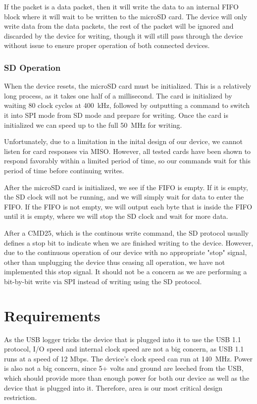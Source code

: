 \documentclass[12pt,letter,oneside]{report}
\begin{document}
If the packet is a data packet, then it will write the data to an internal FIFO block where it will wait to be written to the microSD card. The device will only write data from the data packets, the rest of the packet will be ignored and discarded by the device for writing, though it will still pass through the device without issue to ensure proper operation of both connected devices.
\subsubsection{SD Operation}
When the device resets, the microSD card must be initialized. This is a relatively long process, as it takes one half of a millisecond. The card is initialized by waiting 80 clock cycles at \SI{400}{\kilo\hertz}, followed by outputting a command to switch it into SPI mode from SD mode and prepare for writing. Once the card is initialized we can speed up to the full \SI{50}{\mega\hertz} for writing.

Unfortunately, due to a limitation in the inital design of our device, we cannot listen for card responses via MISO. However, all tested cards have been shown to respond favorably within a limited period of time, so our commands wait for this period of time before continuing writes.

After the microSD card is initialized, we see if the FIFO is empty. If it is empty, the SD clock will not be running, and we will simply wait for data to enter the FIFO. If the FIFO is not empty, we will output each byte that is inside the FIFO until it is empty, where we will stop the SD clock and wait for more data.

After a CMD25, which is the continous write command, the SD protocol usually defines a stop bit to indicate when we are finished writing to the device. However, due to the continuous operation of our device with no appropriate "stop" signal, other than unplugging the device thus ceasing all operation, we have not implemented this stop signal. It should not be a concern as we are performing a bit-by-bit write via SPI instead of writing using the SD protocol.
\section{Requirements}
As the USB logger tricks the device that is plugged into it to use the USB 1.1 protocol, I/O speed and internal clock speed are not a big concern, as USB 1.1 runs at a speed of 12 Mbps. The device’s clock speed can run at \SI{140}{\mega\hertz}. Power is also not a big concern, since 5+ volts and ground are leeched from the USB, which should provide more than enough power for both our device as well as the device that is plugged into it. Therefore, area is our most critical design restriction.
\end{document}
